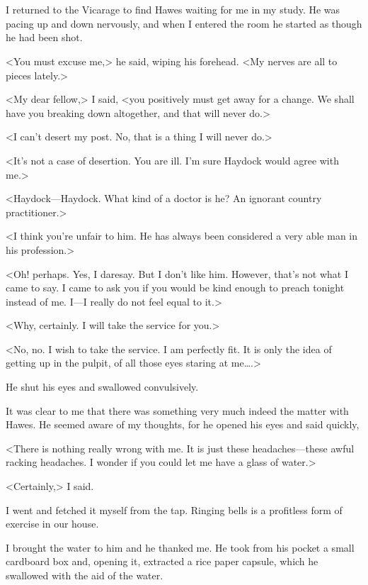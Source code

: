 \chapter[Chapter  \thechapter]{}


\lettrine{I}{} returned to the Vicarage to find Hawes waiting for me in my study. He was pacing up and down nervously, and when I entered the room he started as though he had been shot.

\zz
<You must excuse me,> he said, wiping his forehead. <My nerves are all to pieces lately.>

<My dear fellow,> I said, <you positively must get away for a change. We shall have you breaking down altogether, and that will never do.>

<I can't desert my post. No, that is a thing I will never do.>

<It's not a case of desertion. You are ill. I'm sure Haydock would agree with me.>

<Haydock—Haydock. What kind of a doctor is he? An ignorant country practitioner.>

<I think you're unfair to him. He has always been considered a very able man in his profession.>

<Oh! perhaps. Yes, I daresay. But I don't like him. However, that's not what I came to say. I came to ask you if you would be kind enough to preach tonight instead of me. I—I really do not feel equal to it.>

<Why, certainly. I will take the service for you.>

<No, no. I wish to take the service. I am perfectly fit. It is only the idea of getting up in the pulpit, of all those eyes staring at me\dots.>

He shut his eyes and swallowed convulsively.

It was clear to me that there was something very much indeed the matter with Hawes. He seemed aware of my thoughts, for he opened his eyes and said quickly,

<There is nothing really wrong with me. It is just these headaches—these awful racking headaches. I wonder if you could let me have a glass of water.>

<Certainly,> I said.

I went and fetched it myself from the tap. Ringing bells is a profitless form of exercise in our house.

I brought the water to him and he thanked me. He took from his pocket a small cardboard box and, opening it, extracted a rice paper capsule, which he swallowed with the aid of the water.


